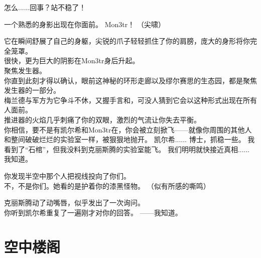 \documentclass[openany]{book}
\begin{document}
\begin{dialogue}
     怎么......回事？站不稳了！\par
    一个熟悉的身影出现在你面前。
     Mon3tr！
     （尖啸）\par
    它在瞬间舒展了自己的身躯，尖锐的爪子轻轻抓住了你的肩膀，庞大的身形将你完全笼罩。\\
    很快，更为巨大的阴影在Mon3tr身后升起。\\
    聚焦发生器。\\
    你直到此刻才得以确认，眼前这神秘的环形走廊以及缪尔赛思的生态园，都是聚焦发生器的一部分。\\
    梅兰德与军方为它争斗不休，又握手言和，可没人猜到它会以这种形式出现在所有人面前。\\
    推进器的火焰几乎刺痛了你的双眼，激烈的气流让你失去平衡。\\
    你相信，要不是有凯尔希和Mon3tr在，你会被立刻掀飞——就像你周围的其他人和整间破破烂烂的实验室一样，被狠狠地抛开。
     凯尔希......
     博士，抓稳一些。
     我看到了“石棺”，但我没料到克丽斯腾的实验室能飞。
     我们明明就快接近真相......
     我知道。\par
    你发现半空中那个人把视线投向了你们。\\
    不，不是你们。她看的是护着你的漆黑怪物。
     （似有所感的嘶鸣）\par
    克丽斯腾动了动嘴唇，似乎发出了一次询问。\\
    你听到凯尔希重复了一遍刚才对你的回答。
     ——我知道。
\end{dialogue}

\chapter{空中楼阁}
\end{document}
